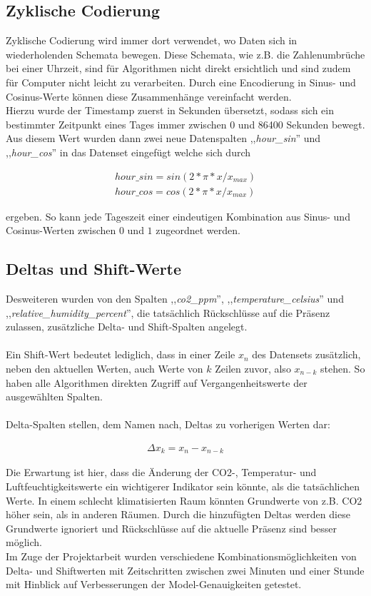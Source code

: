 \subsection{Zyklische Codierung}
Zyklische Codierung wird immer dort verwendet, wo Daten sich in wiederholenden Schemata bewegen. Diese 
Schemata, wie z.B. die Zahlenumbrüche bei einer Uhrzeit, sind für Algorithmen nicht direkt ersichtlich und 
sind zudem für Computer nicht leicht zu verarbeiten. Durch eine Encodierung in 
Sinus- und Cosinus-Werte können diese Zusammenhänge vereinfacht werden.\\
Hierzu wurde der Timestamp zuerst in Sekunden übersetzt, sodass sich ein bestimmter Zeitpunkt eines Tages 
immer zwischen 0 und 86400 Sekunden bewegt.
Aus diesem Wert wurden dann zwei neue Datenspalten ,,\textit{hour\_sin}'' und ,,\textit{hour\_cos}'' 
in das Datenset eingefügt welche sich durch 

\begin{align}
    hour\_sin = sin(2 * \pi * x / x_{max}) \\ 
    hour\_cos = cos(2 * \pi * x / x_{max})
\end{align} 

ergeben. So kann jede Tageszeit einer eindeutigen Kombination aus Sinus- und Cosinus-Werten zwischen 
$0$ und $1$ zugeordnet werden.

\subsection{Deltas und Shift-Werte}
Desweiteren wurden von den Spalten ,,\textit{co2\_ppm}'', ,,\textit{temperature\_celsius}'' und \break 
,,\textit{relative\_humidity\_percent}'', die tatsächlich Rückschlüsse auf die Präsenz zulassen, \break 
zusätzliche Delta- und Shift-Spalten angelegt.\\\\
Ein Shift-Wert bedeutet lediglich, dass  in einer Zeile $x_n$ des Datensets 
zusätzlich, neben den aktuellen Werten, auch Werte von $k$ Zeilen zuvor, also $x_{n-k}$ stehen. So haben 
alle Algorithmen direkten Zugriff auf Vergangenheitswerte der ausgewählten Spalten.\\\\
Delta-Spalten stellen, dem Namen nach, Deltas zu vorherigen Werten dar:

\begin{align}
    \Delta x_k = x_n - x_{n-k}    
\end{align}

Die Erwartung ist hier, dass die Änderung der CO2-, Temperatur- und 
Luftfeuchtigkeitswerte ein wichtigerer Indikator sein könnte, als die tatsächlichen Werte. In einem schlecht 
klimatisierten Raum könnten Grundwerte von z.B. CO2 höher sein, als in anderen Räumen. Durch die hinzufügten 
Deltas werden diese Grundwerte ignoriert und Rückschlüsse auf die aktuelle Präsenz sind besser möglich.\\
Im Zuge der Projektarbeit wurden verschiedene Kombinationsmöglichkeiten von Delta- und Shiftwerten mit 
Zeitschritten zwischen zwei Minuten und einer Stunde mit Hinblick auf Verbesserungen der Model-Genauigkeiten 
getestet.

